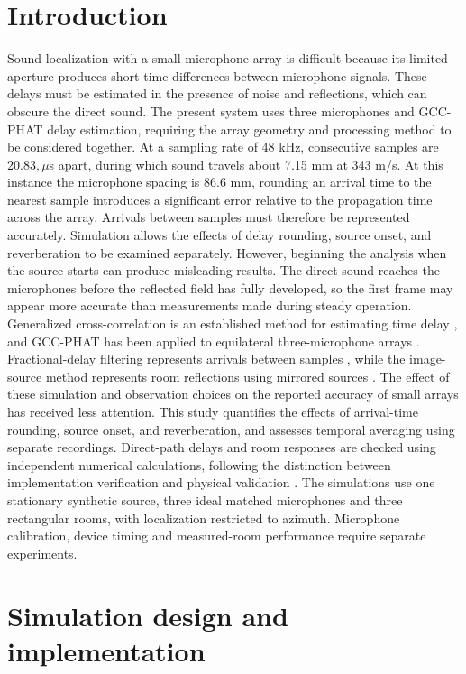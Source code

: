 \documentclass{edpsci}
\begin{document}
\section{Introduction}
Sound localization with a small microphone array is difficult because its limited aperture produces short time differences between microphone signals. These delays must be estimated in the presence of noise and reflections, which can obscure the direct sound. The present system uses three microphones and GCC-PHAT delay estimation, requiring the array geometry and processing method to be considered together.
At a sampling rate of 48 kHz, consecutive samples are $20.83,\mu$s apart, during which sound travels about 7.15 mm at 343 m/s. At this instance the microphone spacing is 86.6 mm, rounding an arrival time to the nearest sample introduces a significant error relative to the propagation time across the array. Arrivals between samples must therefore be represented accurately.
Simulation allows the effects of delay rounding, source onset, and reverberation to be examined separately. However, beginning the analysis when the source starts can produce misleading results. The direct sound reaches the microphones before the reflected field has fully developed, so the first frame may appear more accurate than measurements made during steady operation.
Generalized cross-correlation is an established method for estimating time delay \citep{knapp}, and GCC-PHAT has been applied to equilateral three-microphone arrays \citep{catur}. Fractional-delay filtering represents arrivals between samples \citep{laakso}, while the image-source method represents room reflections using mirrored sources \citep{allen}. The effect of these simulation and observation choices on the reported accuracy of small arrays has received less attention.
This study quantifies the effects of arrival-time rounding, source onset, and reverberation, and assesses temporal averaging using separate recordings. Direct-path delays and room responses are checked using independent numerical calculations, following the distinction between implementation verification and physical validation \citep{ernoult}. The simulations use one stationary synthetic source, three ideal matched microphones and three rectangular rooms, with localization restricted to azimuth. Microphone calibration, device timing and measured-room performance require separate experiments.

\section{Simulation design and implementation}
\end{document}
